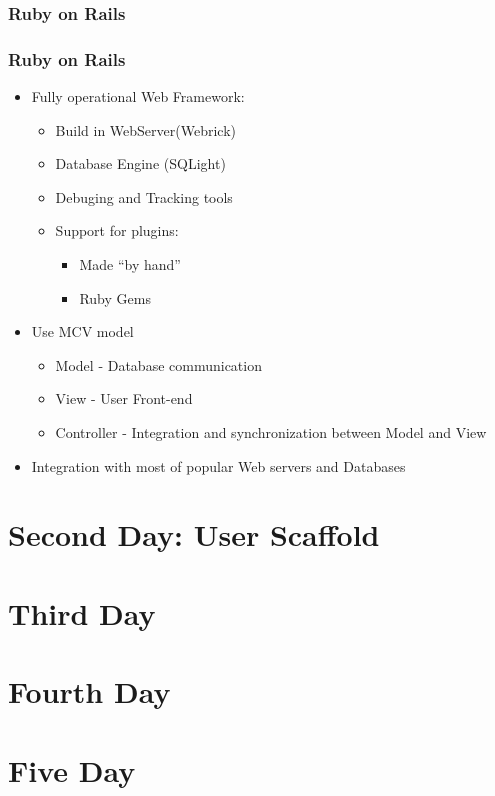 \documentclass{beamer}
\begin{document}
\subsubsection{Ruby on Rails}

\begin{frame}
  \frametitle{Ruby on Rails}
  \begin{itemize}
    \item Fully operational Web Framework:
      \begin{itemize}
        \item Build in WebServer(Webrick)
        \item Database Engine (SQLight)
        \item Debuging and Tracking tools
        \item Support for plugins:
          \begin{itemize}
            \item Made ``by hand''
            \item Ruby Gems 
          \end{itemize}

      \end{itemize}
    \item Use MCV model
      \begin{itemize}
        \item Model - Database communication
        \item View - User Front-end
        \item Controller - Integration and synchronization between Model and View
      \end{itemize}
    \item Integration with most of popular Web servers and Databases

  \end{itemize}
  
\end{frame}

\section{Second Day: User Scaffold}

\section{Third Day}

\section{Fourth Day}

\section{Five Day}
  
\end{document}
